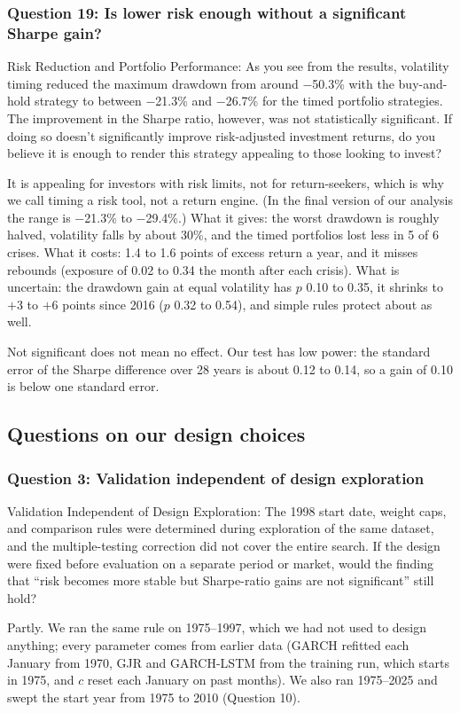 \subsubsection*{Question 19: Is lower risk enough without a significant Sharpe gain?}
\begin{question}
Risk Reduction and Portfolio Performance: As you see from the results, volatility timing reduced the maximum drawdown from around $-$50.3\% with the buy-and-hold strategy to between $-$21.3\% and $-$26.7\% for the timed portfolio strategies. The improvement in the Sharpe ratio, however, was not statistically significant. If doing so doesn't significantly improve risk-adjusted investment returns, do you believe it is enough to render this strategy appealing to those looking to invest?
\end{question}
It is appealing for investors with risk limits, not for return-seekers, which is why we call timing a risk tool, not a return engine. (In the final version of our analysis the range is $-$21.3\% to $-$29.4\%.) What it gives: the worst drawdown is roughly halved, volatility falls by about 30\%, and the timed portfolios lost less in 5 of 6 crises. What it costs: 1.4 to 1.6 points of excess return a year, and it misses rebounds (exposure of 0.02 to 0.34 the month after each crisis). What is uncertain: the drawdown gain at equal volatility has $p$ 0.10 to 0.35, it shrinks to $+$3 to $+$6 points since 2016 ($p$ 0.32 to 0.54), and simple rules protect about as well.

Not significant does not mean no effect. Our test has low power: the standard error of the Sharpe difference over 28 years is about 0.12 to 0.14, so a gain of 0.10 is below one standard error.

\subsection{Questions on our design choices}

\subsubsection*{Question 3: Validation independent of design exploration}
\begin{question}
Validation Independent of Design Exploration: The 1998 start date, weight caps, and comparison rules were determined during exploration of the same dataset, and the multiple-testing correction did not cover the entire search. If the design were fixed before evaluation on a separate period or market, would the finding that ``risk becomes more stable but Sharpe-ratio gains are not significant'' still hold?
\end{question}
Partly. We ran the same rule on 1975--1997, which we had not used to design anything; every parameter comes from earlier data (GARCH refitted each January from 1970, GJR and GARCH-LSTM from the training run, which starts in 1975, and $c$ reset each January on past months). We also ran 1975--2025 and swept the start year from 1975 to 2010 (Question 10).

